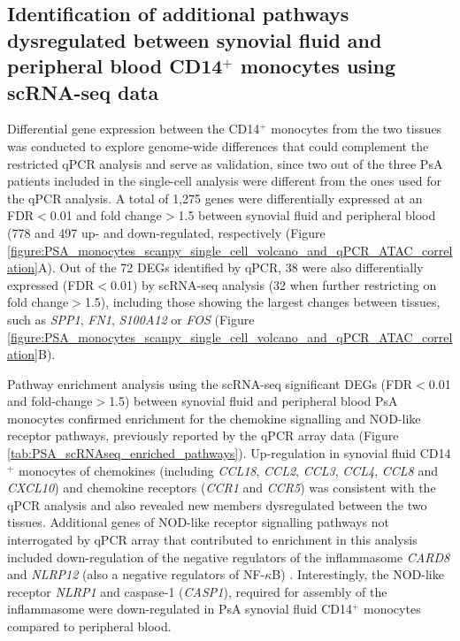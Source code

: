\subsection{Identification of additional pathways dysregulated between  synovial fluid and peripheral blood CD14$^+$ monocytes using scRNA-seq data }
Differential gene expression between the CD14$^+$ monocytes from the two tissues was conducted to explore genome-wide differences that could complement the restricted qPCR analysis and serve as validation, since two out of the three PsA patients included in the single-cell analysis were different from the ones used for the qPCR analysis. A total of 1,275 genes were differentially expressed at an FDR$<$0.01 and fold change$>$1.5 between synovial fluid and peripheral blood (778 and 497 up- and down-regulated, respectively (Figure \ref{figure:PSA_monocytes_scanpy_single_cell_volcano_and_qPCR_ATAC_correlation}A). Out of the 72 DEGs identified by qPCR, 38 were also differentially expressed (FDR$<$0.01) by scRNA-seq analysis (32 when further restricting on fold change$>$1.5), including those showing  the largest changes between tissues, such as \textit{SPP1}, \textit{FN1}, \textit{S100A12} or \textit{FOS} (Figure \ref{figure:PSA_monocytes_scanpy_single_cell_volcano_and_qPCR_ATAC_correlation}B). 


Pathway enrichment analysis using the scRNA-seq significant DEGs (FDR$<$0.01 and fold-change$>$1.5) between synovial fluid and peripheral blood PsA monocytes confirmed enrichment for the chemokine signalling and NOD-like receptor pathways, previously reported by the qPCR array data (Figure \ref{tab:PSA_scRNAseq_enriched_pathways}). Up-regulation in synovial fluid CD14$^+$ monocytes of chemokines (including \textit{CCL18}, \textit{CCL2}, \textit{CCL3}, \textit{CCL4}, \textit{CCL8} and \textit{CXCL10}) and chemokine receptors (\textit{CCR1} and \textit{CCR5}) was consistent with the qPCR analysis and also revealed new members dysregulated between the two tissues. Additional genes of NOD-like receptor signalling pathways not interrogated by qPCR array that contributed to enrichment in this analysis included down-regulation of the negative regulators of the inflammasome \textit{CARD8} and \textit{NLRP12} (also a negative regulators of NF-$\kappa$B) \parencite{Mao2018,Williams2005}. Interestingly, the NOD-like receptor \textit{NLRP1} and caspase-1 (\textit{CASP1}), required for assembly of the inflammasome were down-regulated in PsA synovial fluid CD14$^+$ monocytes compared to peripheral blood.


